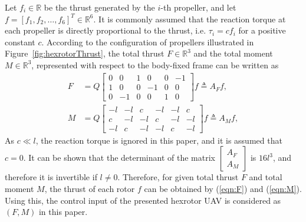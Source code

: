 \documentclass[twocolumn,letterpaper]{IEEEAerospaceCLS}  %
\newcommand{\refeqn}[1]{(\ref{eqn:#1})}
\renewcommand{\Re}{\mathbb{R}}
\newcommand{\EditTL}[1]{{\color{blue}\protect #1}}
\begin{document}
Let $f_i\in\Re$ be the thrust generated by the $i$-th propeller, and let $f=[f_1,f_2,\ldots,f_6]^T\in{\Re}^6$. It is commonly assumed that the reaction torque at each propeller is directly proportional to the thrust, i.e. $\tau_i = c f_i$ for a positive constant $c$. According to the configuration of propellers illustrated in Figure~\ref{fig:hexrotorThrust}, the total thrust $F\in{\Re}^3$ and the total moment $M\in{\Re}^3$, represented with respect to the body-fixed frame can be written as
\begin{align}
F&=
Q\begin{bmatrix}
0 & 0 & 1 & 0 & 0 & -1 \\
1 & 0 & 0 & -1 & 0 & 0 \\
0 & -1 & 0 & 0 & 1 & 0
\end{bmatrix}f\triangleq A_F f,\label{eqn:Fmat}\\
M&=
Q\begin{bmatrix}
-l & -l & c & -l & -l & c \\
c & -l & -l & c & -l & -l \\
-l & c & -l & -l & c & -l
\end{bmatrix}f\triangleq A_M f,\label{eqn:Mmat}
\end{align}
As $c\ll l$, the reaction torque is ignored in this paper, and it is assumed that $c=0$. It can be shown that the determinant of the matrix $\begin{bmatrix}A_F\\A_M\end{bmatrix}$ is $16l^3$, and therefore it is invertible if $l\neq 0$. Therefore, for given total thrust $F$ and total moment $M$, the thrust of each rotor $f$ can be obtained by \refeqn{F} and \refeqn{M}. Using this, the control input of the presented hexrotor UAV is considered as $(F,M)$ in this paper. 
\end{document}
